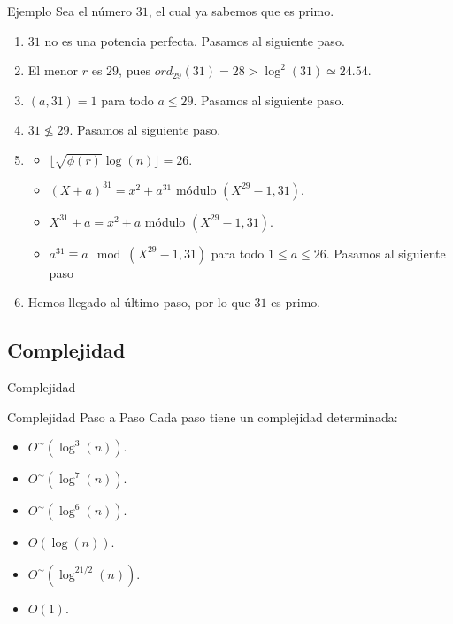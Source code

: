 \documentclass{beamer}
\begin{document}
\begin{frame}{Ejemplo}
	Sea el número $31$, el cual ya sabemos que es primo.
	
	\begin{enumerate}[<+(1)->]
		\item $31$ no es una potencia perfecta. Pasamos al siguiente paso.
		
		\item El menor $r$ es $29$, pues $ord_{29}(31) = 28 > \log^2(31) \simeq 24.54$.
		
		\item $(a, 31) = 1$ para todo $a \leq 29$. Pasamos al siguiente paso.
		
		\item $31 \not\leq 29$. Pasamos al siguiente paso.
		
		\item
		
		\begin{itemize}
			\item $\lfloor\sqrt{\phi(r)}\log(n)\rfloor = 26$.
			
			\item $(X + a)^{31} = x^2 + a^{31}$ módulo $(X^{29}-1, 31)$.
			
			\item $X^{31} + a = x^2 + a$ módulo $(X^{29}-1, 31)$.
			
			\item $a^{31} \equiv a \mod(X^{29}-1, 31)$ para todo $1 \leq a \leq 26$. Pasamos al siguiente paso
		\end{itemize}
		
		\item Hemos llegado al último paso, por lo que $31$ es primo.
	\end{enumerate}
\end{frame}

\subsection{Complejidad}

\begin{frame}
	\centering
	\begin{Large}
		Complejidad
	\end{Large}
\end{frame}

\begin{frame}{Complejidad Paso a Paso}
	Cada paso tiene un complejidad determinada:\break
	
	\begin{itemize}[<+(1)->]
		\item $O^\sim(\log^3(n))$.
		\item $O^\sim(\log^7(n))$.
		\item $O^\sim(\log^6(n))$.
		\item $O(\log(n))$.
		\item $O^\sim(\log^{21/2}(n))$.
		\item $O(1)$.
	\end{itemize}
\end{frame}
\end{document}
